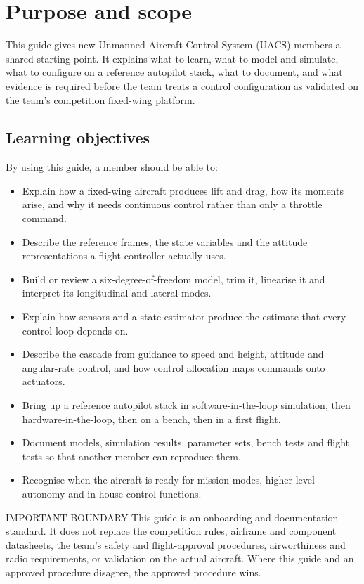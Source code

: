 \documentclass[11pt,a4paper]{article}
\begin{document}
\tableofcontents
\clearpage

\section{Purpose and scope}

This guide gives new Unmanned Aircraft Control System (UACS) members a shared
starting point. It explains what to learn, what to model and simulate, what to
configure on a reference autopilot stack, what to document, and what evidence
is required before the team treats a control configuration as validated on the
team's competition fixed-wing platform.

\subsection{Learning objectives}

By using this guide, a member should be able to:

\begin{itemize}
  \item Explain how a fixed-wing aircraft produces lift and drag, how its moments arise, and why it needs continuous control rather than only a throttle command.
  \item Describe the reference frames, the state variables and the attitude representations a flight controller actually uses.
  \item Build or review a six-degree-of-freedom model, trim it, linearise it and interpret its longitudinal and lateral modes.
  \item Explain how sensors and a state estimator produce the estimate that every control loop depends on.
  \item Describe the cascade from guidance to speed and height, attitude and angular-rate control, and how control allocation maps commands onto actuators.
  \item Bring up a reference autopilot stack in software-in-the-loop simulation, then hardware-in-the-loop, then on a bench, then in a first flight.
  \item Document models, simulation results, parameter sets, bench tests and flight tests so that another member can reproduce them.
  \item Recognise when the aircraft is ready for mission modes, higher-level autonomy and in-house control functions.
\end{itemize}

\begin{callout}{IMPORTANT BOUNDARY}
  This guide is an onboarding and documentation standard. It does not replace
  the competition rules, airframe and component datasheets, the team's safety
  and flight-approval procedures, airworthiness and radio requirements, or
  validation on the actual aircraft. Where this guide and an approved procedure
  disagree, the approved procedure wins.
\end{callout}
\end{document}
